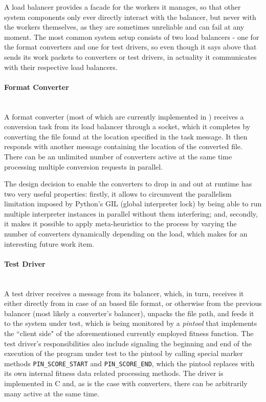   A load balancer provides a facade for the workers it manages, so that other system components only ever
  directly interact with the balancer, but never with the workers themselves, as they are sometimes unreliable
  and can fail at any moment. The most common system setup consists of two load balancers - one for the format
  converters and one for test drivers, so even though it says above that \xmlmate sends its work packets to
  converters or test drivers, in actuality it communicates with their respective load balancers. 
  \paragraph{Format Converter} ~\\
  A format converter (most of which are currently implemented in \python) receives a conversion task from
  its load balancer through a \zmq socket, which it completes by converting the file found at the location
  specified in the task message. It then responds with another message containing the location of the converted
  file. There can be an unlimited number of converters active at the same time processing multiple
  conversion requests in parallel. 
  
  The design decision to enable the converters to drop in and out at
  runtime has two very useful properties: firstly, it allows to circumvent the parallelism limitation
  imposed by {\small Python's} GIL (global interpreter lock) by being able to run multiple interpreter
  instances in parallel without them interfering; and, secondly, it makes it possible to apply meta-heuristics
  to the process by varying the number of converters dynamically depending on the load, which makes for an
  interesting future work item.
  \paragraph{Test Driver} ~\\
  A test driver receives a message from its balancer, which, in turn, receives it either directly from
  \xmlmate in case of an \xml based file format, or otherwise from the previous balancer (most likely a 
  converter's balancer), unpacks the file path, and feeds it to the system under test, which is being monitored
  by a \emph{pintool} that implements the ``client side" of the aforementioned currently employed fitness
  function. The test driver's responsibilities also include signaling the beginning and end of the execution of
  the program under test to the pintool by calling special marker methods \texttt{PIN\_SCORE\_START}
  and \texttt{PIN\_SCORE\_END}, which the pintool replaces with its own internal fitness data related
  processing methods. The driver is implemented in {\small C} and, as is the case with converters, there can
  be arbitrarily many active at the same time.
